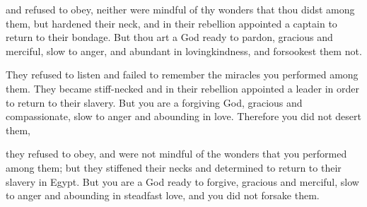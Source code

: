 			\begin{versebox}
					\item[BHS] 
					\item[LXX] 
					\item[ASV] and refused to obey, neither were mindful of thy wonders that thou didst among them, but hardened their neck, and in their rebellion appointed a captain to return to their bondage. But thou art a God ready to pardon, gracious and merciful, slow to anger, and abundant in lovingkindness, and forsookest them not.
					\item[NIV] They refused to listen and failed to remember the miracles you performed among them. They became stiff-necked and in their rebellion appointed a leader in order to return to their slavery. But you are a forgiving God, gracious and compassionate, slow to anger and abounding in love. Therefore you did not desert them,
					\item[NRSV] they refused to obey, and were not mindful of the wonders that you performed among them; but they stiffened their necks and determined to return to their slavery in Egypt. But you are a God ready to forgive, gracious and merciful, slow to anger and abounding in steadfast love, and you did not forsake them.
			\end{versebox}

